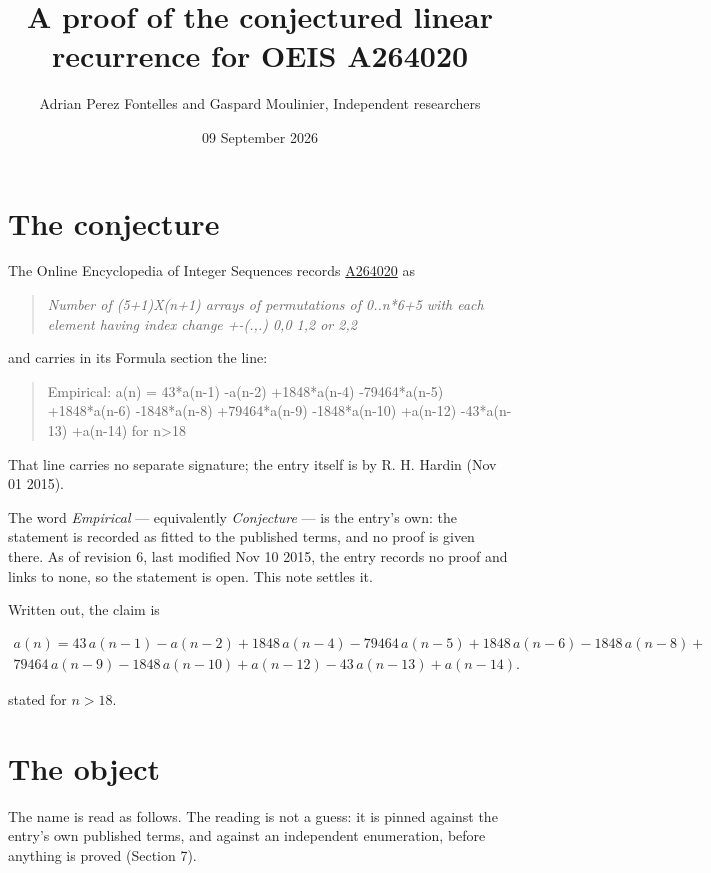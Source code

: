 \documentclass[11pt]{article}
\title{A proof of the conjectured linear recurrence for OEIS A264020}
\author{Adrian Perez Fontelles and Gaspard Moulinier, Independent researchers}
\date{09 September 2026}
\theoremstyle{definition}
\begin{document}
\maketitle
\section{The conjecture}

The Online Encyclopedia of Integer Sequences records \href{https://oeis.org/A264020}{A264020} as

\begin{quote}\itshape Number of (5+1)X(n+1) arrays of permutations of 0..n*6+5 with each element having index change +-(.,.) 0,0 1,2 or 2,2\end{quote}

and carries in its Formula section the line:

\begin{quote}\ttfamily Empirical: a(n) = 43*a(n-1) -a(n-2) +1848*a(n-4) -79464*a(n-5) +1848*a(n-6) -1848*a(n-8) +79464*a(n-9) -1848*a(n-10) +a(n-12) -43*a(n-13) +a(n-14) for n>18\end{quote}

That line carries no separate signature; the entry itself is by R. H. Hardin (Nov 01 2015).

The word {\itshape Empirical} --- equivalently {\itshape Conjecture} --- is the entry's own: the statement is recorded as fitted to the published terms, and no proof is given there. As of revision 6, last modified Nov 10 2015, the entry records no proof and links to none, so the statement is open. This note settles it.

Written out, the claim is

\begin{multline*} a(n) = 43\,a(n-1) - a(n-2) + 1848\,a(n-4) - 79464\,a(n-5) + 1848\,a(n-6) - 1848\,a(n-8) + \\ 79464\,a(n-9) - 1848\,a(n-10) + a(n-12) - 43\,a(n-13) + a(n-14). \end{multline*}

stated for $n > 18$.

\section{The object}

The name is read as follows. The reading is not a guess: it is pinned against the entry's own published terms, and against an independent enumeration, before anything is proved (Section 7).
\end{document}
